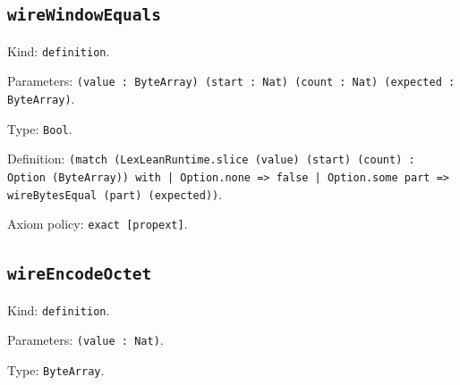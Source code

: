 \documentclass[11pt]{article}
\begin{document}
\subsection*{\texttt{wireWindowEquals}}
\noindent Kind: \texttt{definition}.\par
\noindent Parameters: \texttt{(value : ByteArray) (start : Nat) (count : Nat) (expected : ByteArray)}.\par
\noindent Type: \texttt{Bool}.\par
\noindent Definition: \texttt{(match (LexLeanRuntime.slice (value) (start) (count) : Option (ByteArray)) with | Option.none => false | Option.some part => wireBytesEqual (part) (expected))}.\par
\noindent Axiom policy: \texttt{exact [propext]}.\par
\subsection*{\texttt{wireEncodeOctet}}
\noindent Kind: \texttt{definition}.\par
\noindent Parameters: \texttt{(value : Nat)}.\par
\noindent Type: \texttt{ByteArray}.\par
\end{document}
